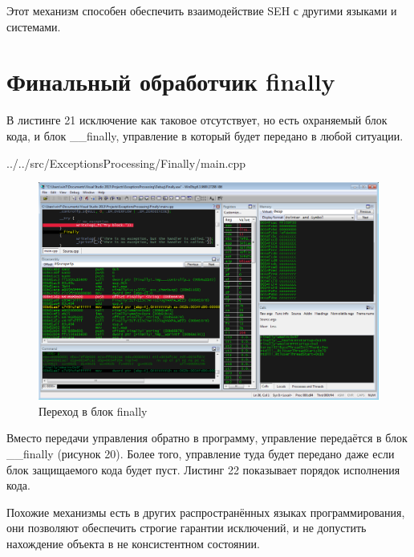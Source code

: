 \documentclass[a4paper, 12pt]{report}		%
\begin{document}
Этот механизм способен обеспечить взаимодействие SEH с другими языками и системами.

\chapter*{Финальный обработчик finally}

В листинге 21 исключение как таковое отсутствует, но есть охраняемый блок кода, и блок \_\_finally, управление в который будет передано в любой ситуации.


{../../src/ExceptionsProcessing/Finally/main.cpp}

\begin{figure}[h!]
\centering
\includegraphics[scale=0.50]{res/013}
\caption{Переход в блок finally}
\end{figure}



Вместо передачи управления обратно в программу, управление передаётся в блок \_\_finally (рисунок 20). Более того, управление туда будет передано даже если блок защищаемого кода будет пуст. Листинг 22 показывает порядок исполнения кода.

Похожие механизмы есть в других распространённых языках программирования, они позволяют обеспечить строгие гарантии исключений, и не допустить нахождение объекта в не консистентном состоянии.
\newpage
\end{document}
